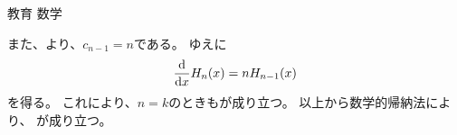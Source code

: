 \documentclass[fleqn]{jbook}
\begin{document}
\begin{answer}{教育 数学}{}
\begin{subanswers}
\begin{subsubanswers}
また、より、$c_{n-1} = n$である。
ゆえに
\[ \frac{\d}{\d x} H_n (x) = n H_{n-1} (x) \]
を得る。
これにより、$n=k$のときもが成り立つ。
以上から数学的帰納法により、
が成り立つ。
\end{subsubanswers}

\end{subanswers}
\end{answer}
\end{document}
